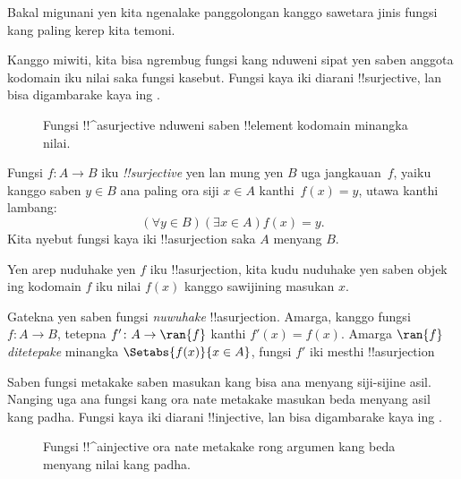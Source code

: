 \documentclass[../../../include/open-logic-section]{subfiles}
\begin{document}

\begin{explain}
Bakal migunani yen kita ngenalake panggolongan
kanggo sawetara jinis fungsi kang paling
kerep kita temoni.

Kanggo miwiti, kita bisa ngrembug fungsi
kang nduweni sipat yen saben anggota
kodomain iku nilai saka fungsi kasebut.
Fungsi kaya iki diarani !!{surjective},
lan bisa digambarake kaya ing .

\begin{figure}
  \caption{Fungsi !!^a{surjective} nduweni
    saben !!{element} kodomain minangka nilai.}
\end{figure}
\end{explain}

\begin{defn}
Fungsi $f \colon A \rightarrow B$ iku
\emph{!!{surjective}} yen lan mung yen
$B$ uga jangkauan~$f$, yaiku kanggo
saben $y \in B$ ana paling ora siji
$x \in A$ kanthi~$f(x) = y$,
utawa kanthi lambang:
\[
  (\forall y \in B)(\exists x \in A)f(x) = y.
\]
Kita nyebut fungsi kaya iki
!!a{surjection} saka $A$ menyang $B$.
\end{defn}

\begin{explain}
Yen arep nuduhake yen $f$ iku
!!a{surjection}, kita kudu nuduhake
yen saben objek ing kodomain $f$
iku nilai $f(x)$ kanggo sawijining
masukan $x$.

Gatekna yen saben fungsi \emph{nuwuhake}
!!a{surjection}.
Amarga, kanggo fungsi $f \colon A \to B$,
tetepna $f' \colon A \to \ran{f}$
kanthi $f'(x) = f(x)$.
Amarga $\ran{f}$ \emph{ditetepake}
minangka $\Setabs{f(x)}{x \in A}$,
fungsi $f'$ iki mesthi
!!a{surjection}
\end{explain}

\begin{explain}
Saben fungsi metakake saben masukan
kang bisa ana menyang siji-sijine asil.
Nanging uga ana fungsi kang ora
nate metakake masukan beda
menyang asil kang padha.
Fungsi kaya iki diarani !!{injective},
lan bisa digambarake kaya ing .
\begin{figure}
  \caption{Fungsi !!^a{injective} ora nate
    metakake rong argumen kang beda
    menyang nilai kang padha.}
\end{figure}
\end{explain}
\end{document}
